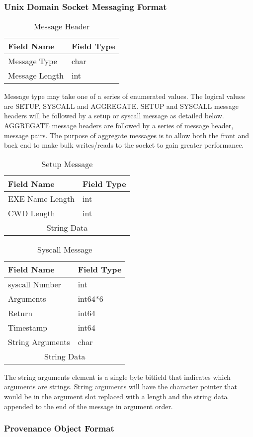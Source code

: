 \subsubsection{Unix Domain Socket Messaging Format}
\label{ProvProt}
\begin{table}[H]
\begin{tabular}{|l|l|}
\hline
Field Name & Field Type\\
\hline
Message Type & char\\
Message Length & int\\
\hline
\end{tabular}
\caption{Message Header}
\end{table}

Message type may take one of a series of enumerated values. The logical values are SETUP, SYSCALL and AGGREGATE. SETUP and SYSCALL message headers will be followed by a setup or syscall message as detailed below. AGGREGATE message headers are followed by a series of message header, message pairs. The purpose of aggregate messages is to allow both the front and back end to make bulk writes/reads to the socket to gain greater performance.

\begin{table}[H]
\begin{tabular}{|l|l|}
\hline
Field Name & Field Type\\
\hline
EXE Name Length & int\\
CWD Length & int\\
\hline
\multicolumn{2}{|c|}{String Data}\\
\hline
\end{tabular}
\caption{Setup Message}
\end{table}

\begin{table}[H]
\begin{tabular}{|l|l|}
\hline
Field Name & Field Type\\
\hline
syscall Number & int\\
Arguments & int64*6\\
Return & int64\\
Timestamp & int64\\
String Arguments & char\\
\hline
\multicolumn{2}{|c|}{String Data}\\
\hline
\end{tabular}
\caption{Syscall Message}
\end{table}

The string arguments element is a single byte bitfield that indicates which arguments are strings. String arguments will have the character pointer that would be in the argument slot replaced with a length and the string data appended to the end of the message in argument order.

\subsubsection{Provenance Object Format}
\label{POF}
\inputminted{protobuf}{../prov_db.proto}
